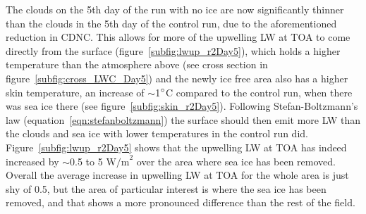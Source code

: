 The clouds on the 5th day of the run with no ice are now significantly thinner than the clouds in the 5th day of the control run, due to the aforementioned reduction in CDNC. This allows for more of the upwelling LW at TOA to come directly from the surface (figure~\ref{subfig:lwup_r2Day5}), which holds a higher temperature than the atmosphere above (see cross section in figure~\ref{subfig:cross_LWC_Day5}) and the newly ice free area also has a higher skin temperature, an increase of $\sim$1$\degree$C compared to the control run, when there was sea ice there (see figure~\ref{subfig:skin_r2Day5}). Following Stefan-Boltzmann's law (equation~\ref{eqn:stefanboltzmann}) the surface should then emit more LW than the clouds and sea ice with lower temperatures in the control run did. Figure~\ref{subfig:lwup_r2Day5} shows that the upwelling LW at TOA has indeed increased by $\sim$0.5 to 5 $\text{W/m}^2$ over the area where sea ice has been removed. Overall the average increase in upwelling LW at TOA for the whole area is just shy of 0.5, but the area of particular interest is where the sea ice has been removed, and that shows a more pronounced difference than the rest of the field.

